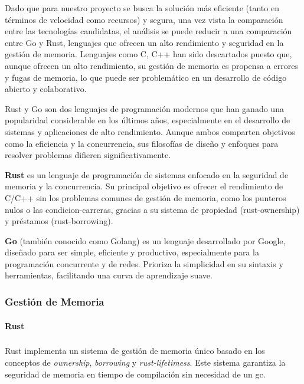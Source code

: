 Dado que para nuestro proyecto se busca la solución más eficiente (tanto en términos de velocidad como recursos) y segura, una vez vista la comparación entre las tecnologías candidatas, el análisis se puede reducir a una comparación entre Go y Rust, lenguajes que ofrecen un alto rendimiento y seguridad en la gestión de memoria.
Lenguajes como C, C++ han sido descartados puesto que, aunque ofrecen un alto rendimiento, su gestión de memoria es propensa a errores y fugas de memoria, lo que puede ser problemático en un desarrollo de código abierto y colaborativo.

Rust y Go son dos lenguajes de programación modernos que han ganado una popularidad considerable en los últimos años, especialmente en el desarrollo de sistemas y aplicaciones de alto rendimiento. Aunque ambos comparten objetivos como la eficiencia y la concurrencia, sus filosofías de diseño y enfoques para resolver problemas difieren significativamente.

\textbf{Rust} es un lenguaje de programación de sistemas enfocado en la seguridad de memoria y la concurrencia. Su principal objetivo es ofrecer el rendimiento de C/C++ sin los problemas comunes de gestión de memoria, como los punteros nulos o las \glspl{condicion-carrera}, gracias a su sistema de propiedad (\gls{rust-ownership}) y préstamos (\gls{rust-borrowing}).

\textbf{Go} (también conocido como Golang) es un lenguaje desarrollado por Google, diseñado para ser simple, eficiente y productivo, especialmente para la programación concurrente y de redes. Prioriza la simplicidad en su sintaxis y herramientas, facilitando una curva de aprendizaje suave.

\subsubsection{Gestión de Memoria}
\paragraph{Rust}
\subparagraph{}

Rust implementa un sistema de gestión de memoria único basado en los conceptos de \textit{ownership}, \textit{borrowing} y \textit{\glspl{rust-lifetimes}}. Este sistema garantiza la seguridad de memoria en tiempo de compilación sin necesidad de un \acrfull{gc}.


